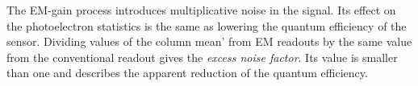 The EM-gain process introduces multiplicative noise in the signal. Its
effect on the photoelectron statistics is the same as lowering the
quantum efficiency of the sensor. Dividing values of the column
\textsf{ mean'} from EM readouts by the same value from the
conventional readout gives the \emph{excess noise factor}. Its value is smaller than one and
describes the apparent reduction of the quantum efficiency.





